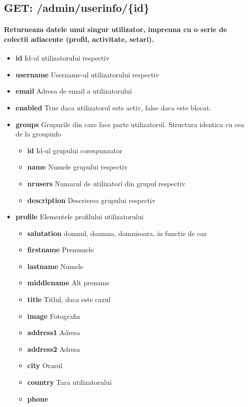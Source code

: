 \subsection*{GET: /admin/userinfo/\{id\}}

\paragraph{Returneaza datele unui singur utilizator, impreuna cu o serie de colectii adiacente (profil, activitate, setari).}
\begin{itemize}
\item \textbf{id}
 Id-ul utilizatorului respectiv
\item \textbf{username}
 Username-ul utilizatorului respectiv
\item \textbf{email}
 Adresa de email a utilizatorului
\item \textbf{enabled}
 True daca utilizatorul este activ, false daca este blocat. 
\item\textbf{groups}
 Grupurile din care face parte utilizatorul. Structura identica cu cea de la groupinfo \begin{itemize}
\item \textbf{id}
 Id-ul grupului corespunzator
\item \textbf{name}
 Numele grupului respectiv
\item \textbf{nrusers}
 Numarul de utilizatori din grupul respectiv
\item \textbf{description}
 Descrierea grupului respectiv
 \end{itemize}
\item\textbf{profile}
 Elementele profilului utilizatorului \begin{itemize}
\item \textbf{salutation}
 domnul, doamna, domnisoara, in functie de caz
\item \textbf{firstname}
 Prenumele
\item \textbf{lastname}
 Numele
\item \textbf{middlename}
 Alt prenume 
\item \textbf{title}
 Titlul, daca este cazul
\item \textbf{image}
 Fotografia
\item \textbf{address1}
 Adresa
\item \textbf{address2}
 Adresa
\item \textbf{city}
 Orasul
\item \textbf{country}
 Tara utilizatorului
\item \textbf{phone}

\end{itemize}
\end{itemize}
